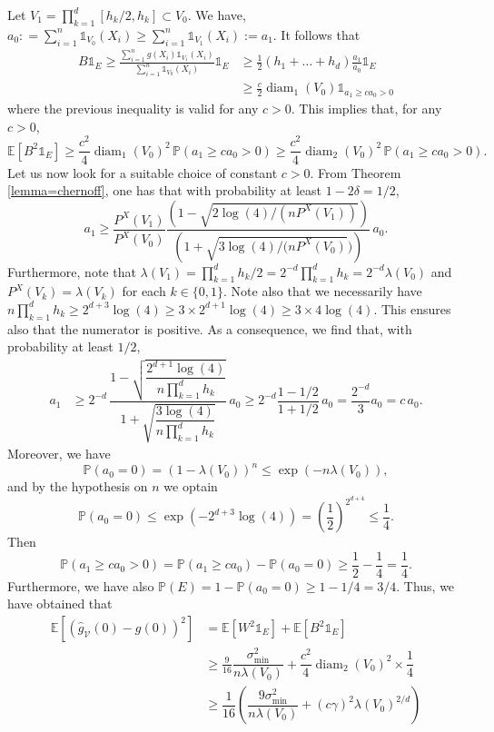 \documentclass[paper=a4, fontsize=11pt]{scrartcl}
\newcommand{\diam}{\operatorname{diam}}
\newcommand{\ind}{\mathds{1}}
\newcommand{\PP}{\mathbb{P}}
\newcommand{\EE}{\mathbb{E}}
\begin{document}
Let  $V_1 = \prod_{k=1}^d [h_k/2 , h_k] \subset V_0$. We have, $a_0: = \sum_{i=1} ^n \ind_{V_0} (X_i)\geq \sum_{i=1} ^n \ind_{{ V_1}} (X_i) := a_1$. It follows that
\begin{align*}
   B \ind_{E} \geq \frac{\sum_{i=1} ^n g(X_i) \ind_{V_1} (X_i)}{\sum_{i=1} ^n \ind_{V_0} (X_i)} \ind_{E} 
    &\geq \frac{1}{2} ( h_1+ \dots + h_d ) \frac{a_1}{a_0} \ind_{E} \\ &\geq \frac{c}{2}  \diam_1( V_0) \ind_{a_1\geq c a_0 > 0}
\end{align*}
where the previous inequality is valid for any $c>0$. This implies that, for any $c>0$,
$$ \EE[B^2 \ind_{E}  ] \geq \frac{c^2}{4}  \diam _1 ( V_0) ^2 \,  \PP(  {a_1\geq ca_0 > 0 } ) \geq \frac{c^2}{4}  \diam _2 ( V_0) ^2 \,  \PP(  {a_1\geq ca_0 > 0 } ) .$$
Let us now look for a suitable choice of constant \( c > 0\). From Theorem \ref{lemma=chernoff}, one has that with probability at least $1 - 2\delta = 1/2$,
$$ a_1 \geq \frac{P^X({ V_1})}{P^X( V_0)} \frac{\left( 1 - \sqrt {2\log(4 ) / (n P^X( V_1)) }  \right )}{\left( 1 + \sqrt {3\log(4 ) / (n  P^X({  V_0 })})  \right )} \,  a_0.$$ Furthermore, note that $\lambda({ V_1}) = \prod_{k=1}^d h_k/2 = 2^{-d} \prod_{k=1}^d h_k = 2^{-d} \lambda( V_0)$ and $P^X({  V_k}) = \lambda({  V_k})$ for each  $k \in \{0,1\}$. Note also that we necessarily have $n \prod_{k=1}^d h_k \geq  2^{d+3} \log(4) \geq 3 \times 2^{d+1} \log(4) \geq 3 \times 4 \log(4).$ This ensures also that the numerator is positive. As a consequence, we find that, with probability at least $1/2$,
\begin{align*}
    a_1 &\geq 2^{-d} \, \dfrac{1 - \sqrt{\dfrac{2^{d+1} \log(4)}{n \prod_{k=1}^d h_k}}}{1+ \sqrt{\dfrac{3 \log(4)}{n \prod_{k=1}^d h_k}}} \, a_0 \geq 2^{-d} \dfrac{1 - 1/2}{1 + 1/2} \, a_0 = \dfrac{2^{-d}}{3} a_0 = c \, a_0.
\end{align*}
Moreover, we have $$\PP(a_0 = 0) =  (1-\lambda(V_0))^n \leq  \exp(-n\lambda(V_0)),$$ and by the hypothesis on $n$ we optain $$\PP(a_0 = 0)  \leq \exp(-2^{d+3}\log(4)) =  \left( \dfrac{1}{2} \right)^{2^{d+4}} \leq \dfrac{1}{4}.$$ Then $$\PP(a_1 \geq c a_0 > 0) = \PP(a_1 \geq c a_0) - \PP(a_0 = 0) \geq \dfrac{1}{2} - \dfrac{1}{4} = \dfrac{1}{4}.$$ Furthermore, we have also $\PP(E) = 1- \PP(a_0 = 0) \geq 1- 1/4 = 3/4.$ Thus, we have obtained that
\begin{align*}
    \EE [ (\hat g_{\mathcal V} (0 ) -  g(0 ))^2 ]  &= \EE[W^2 \ind_{E} ] + \EE [B^2 \ind_{E} ] \\ 
    &\geq \frac{9}{16}\dfrac{\sigma^2_{\text{min}}}{n \lambda (  V_0)} + \dfrac{ c ^2}{4} 
     \diam_2 ( V_0)^2 \times \dfrac 1 4  \\
    &\geq \dfrac{1}{16} \left(\dfrac{9\sigma^2_{\text{min}}}{n \lambda (  V_0)} + {(c \gamma)^2} \lambda ( V_ 0)^{2/d} \right) 
\end{align*}
\end{document}
